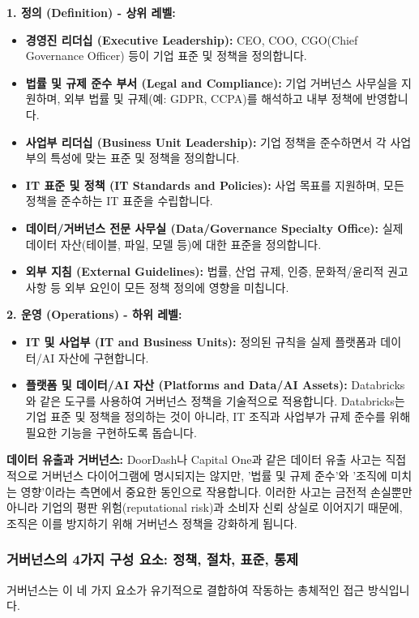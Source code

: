 \documentclass[11pt,a4paper]{article}
\begin{document}
\textbf{1. 정의 (Definition) - 상위 레벨:}
\begin{itemize}
    \item \textbf{경영진 리더십 (Executive Leadership):} CEO, COO, CGO(Chief Governance Officer) 등이 기업 표준 및 정책을 정의합니다.
    \item \textbf{법률 및 규제 준수 부서 (Legal and Compliance):} 기업 거버넌스 사무실을 지원하며, 외부 법률 및 규제(예: GDPR, CCPA)를 해석하고 내부 정책에 반영합니다.
    \item \textbf{사업부 리더십 (Business Unit Leadership):} 기업 정책을 준수하면서 각 사업부의 특성에 맞는 표준 및 정책을 정의합니다.
    \item \textbf{IT 표준 및 정책 (IT Standards and Policies):} 사업 목표를 지원하며, 모든 정책을 준수하는 IT 표준을 수립합니다.
    \item \textbf{데이터/거버넌스 전문 사무실 (Data/Governance Specialty Office):} 실제 데이터 자산(테이블, 파일, 모델 등)에 대한 표준을 정의합니다.
    \item \textbf{외부 지침 (External Guidelines):} 법률, 산업 규제, 인증, 문화적/윤리적 권고 사항 등 외부 요인이 모든 정책 정의에 영향을 미칩니다.
\end{itemize}

\textbf{2. 운영 (Operations) - 하위 레벨:}
\begin{itemize}
    \item \textbf{IT 및 사업부 (IT and Business Units):} 정의된 규칙을 실제 플랫폼과 데이터/AI 자산에 구현합니다.
    \item \textbf{플랫폼 및 데이터/AI 자산 (Platforms and Data/AI Assets):} Databricks와 같은 도구를 사용하여 거버넌스 정책을 기술적으로 적용합니다. Databricks는 기업 표준 및 정책을 정의하는 것이 아니라, IT 조직과 사업부가 규제 준수를 위해 필요한 기능을 구현하도록 돕습니다.
\end{itemize}

\begin{cautionbox}
\textbf{데이터 유출과 거버넌스:}
DoorDash나 Capital One과 같은 데이터 유출 사고는 직접적으로 거버넌스 다이어그램에 명시되지는 않지만, '법률 및 규제 준수'와 '조직에 미치는 영향'이라는 측면에서 중요한 동인으로 작용합니다. 이러한 사고는 금전적 손실뿐만 아니라 기업의 평판 위험(reputational risk)과 소비자 신뢰 상실로 이어지기 때문에, 조직은 이를 방지하기 위해 거버넌스 정책을 강화하게 됩니다.
\end{cautionbox}

\subsubsection*{거버넌스의 4가지 구성 요소: 정책, 절차, 표준, 통제}
거버넌스는 이 네 가지 요소가 유기적으로 결합하여 작동하는 총체적인 접근 방식입니다.
\end{document}
